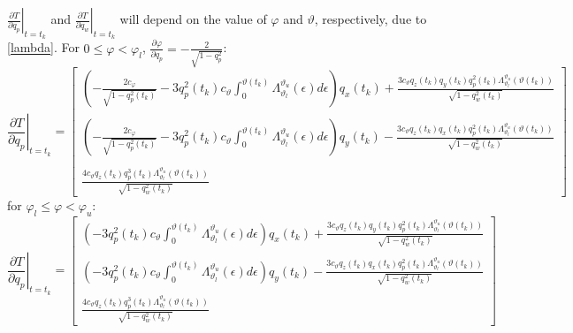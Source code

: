 \documentclass{article}
\begin{document}
		$\left .\frac{\partial T}{\partial q_p}\right |_{t=t_k}$ and $\left .\frac{\partial T}{\partial q_w}\right |_{t=t_k}$ will depend on the value of $\varphi$ and $\vartheta$, respectively, due to \eqref{lambda}. For $0 \leq \varphi < \varphi_l$, $\frac{\partial \varphi}{\partial q_p} = - \frac{2}{\sqrt{1-q_p^2}}$:
		\[
			\left .\frac{\partial T}{\partial q_p}\right |_{t=t_k}  = \begin{bmatrix}
												\left (-\frac{2 c_\varphi}{\sqrt{1-q_p^2(t_k)}} - 3 q_p^2(t_k) c_\vartheta \displaystyle \int_0^{\vartheta(t_k)}{\Lambda_{\vartheta_l}^{\vartheta_u}(\epsilon)} d\epsilon \right )q_x(t_k) + \displaystyle\frac{3 c_\vartheta q_z(t_k) q_y(t_k) q_p^2(t_k) \Lambda_{\vartheta_l}^{\vartheta_u}(\vartheta(t_k))}{\sqrt{1-q_w^2(t_k)}}  \\\\
												\left (-\frac{2 c_\varphi}{\sqrt{1-q_p^2(t_k)}} - 3 q_p^2(t_k) c_\vartheta \displaystyle \int_0^{\vartheta(t_k)}{\Lambda_{\vartheta_l}^{\vartheta_u}(\epsilon)} d\epsilon \right )q_y(t_k) - \displaystyle\frac{3 c_\vartheta q_z(t_k) q_x(t_k) q_p^2(t_k) \Lambda_{\vartheta_l}^{\vartheta_u}(\vartheta(t_k))}{\sqrt{1-q_w^2(t_k)}} \\\\
												\displaystyle \frac{4 c_\vartheta q_z(t_k) q_p^3(t_k) \Lambda_{\vartheta_l}^{\vartheta_u}(\vartheta(t_k))}{\sqrt{1-q_w^2(t_k)}}
											   \end{bmatrix}
		\] 
		for $\varphi_l \leq \varphi < \varphi_u$:
		\[
			\left .\frac{\partial T}{\partial q_p}\right |_{t=t_k}  = \begin{bmatrix}
												\left (- 3 q_p^2(t_k) c_\vartheta \displaystyle \int_0^{\vartheta(t_k)}{\Lambda_{\vartheta_l}^{\vartheta_u}(\epsilon)} d\epsilon \right )q_x(t_k) + \displaystyle\frac{3 c_\vartheta q_z(t_k) q_y(t_k) q_p^2(t_k) \Lambda_{\vartheta_l}^{\vartheta_u}(\vartheta(t_k))}{\sqrt{1-q_w^2(t_k)}}  \\\\
												\left ( - 3 q_p^2(t_k) c_\vartheta \displaystyle \int_0^{\vartheta(t_k)}{\Lambda_{\vartheta_l}^{\vartheta_u}(\epsilon)} d\epsilon \right )q_y(t_k) - \displaystyle\frac{3 c_\vartheta q_z(t_k) q_x(t_k) q_p^2(t_k) \Lambda_{\vartheta_l}^{\vartheta_u}(\vartheta(t_k))}{\sqrt{1-q_w^2(t_k)}} \\\\
												\displaystyle \frac{4 c_\vartheta q_z(t_k) q_p^3(t_k) \Lambda_{\vartheta_l}^{\vartheta_u}(\vartheta(t_k))}{\sqrt{1-q_w^2(t_k)}}
											   \end{bmatrix}
		\] 
\end{document}
